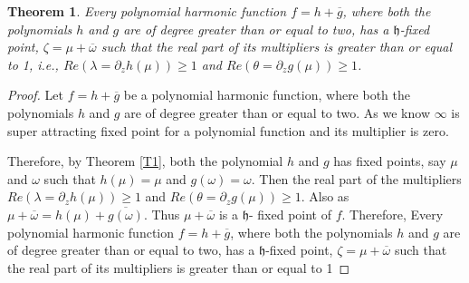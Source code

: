 \documentclass[a4paper,12pt,reqno]{amsart}
\newtheorem{thm}{Theorem}
\begin{document}
\begin{thm}\label{T2}
    Every polynomial harmonic function $f=h+\overline{g}$, where both the polynomials $h$ and $g$ are of degree greater than or equal to two, has a $\mathfrak{h}$-fixed point, $\zeta=\mu+\overline{\omega}$ such that the real part of its multipliers is greater than or equal to 1, i.e., $Re\left( \lambda=\partial_{z}h(\mu)\right)\geq 1$ and $Re\left( \theta=\partial_{z}g(\mu)\right)\geq 1$.
\end{thm}
\begin{proof}
Let $f=h+\overline{g}$ be a polynomial harmonic function, where both the polynomials $h$ and $g$ are of degree greater than or equal to two. As we know $\infty$ is super attracting fixed point for a polynomial function and its multiplier is zero.

Therefore, by Theorem \ref{T1}, both the polynomial $h$ and $g$ has fixed points, say $\mu$
 and $\omega$ such that $h(\mu)=\mu$ and $g(\omega)=\omega$. Then the real part of the multipliers  $Re\left( \lambda=\partial_{z}h(\mu)\right)\geq 1$ and $Re\left( \theta=\partial_{z}g(\mu)\right)\geq 1$. Also as $\mu+\overline{\omega}=h(\mu)+\overline{g(\omega)}$. Thus $\mu+\overline{\omega}$ is a $\mathfrak{h}$- fixed point of $f$. Therefore,   Every polynomial harmonic function $f=h+\overline{g}$, where both the polynomials $h$ and $g$ are of degree greater than or equal to two, has a $\mathfrak{h}$-fixed point, $\zeta=\mu+\overline{\omega}$ such that the real part of its multipliers is greater than or equal to 1
\end{proof}
\end{document}
